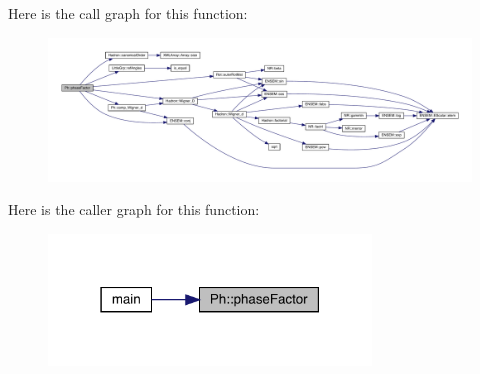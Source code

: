 Here is the call graph for this function\+:\nopagebreak
\begin{figure}[H]
\begin{center}
\leavevmode
\includegraphics[width=350pt]{d6/d3c/namespacePh_a438e6a04475dc71cc60cc5ad034e09b0_cgraph}
\end{center}
\end{figure}
Here is the caller graph for this function\+:
\nopagebreak
\begin{figure}[H]
\begin{center}
\leavevmode
\includegraphics[width=243pt]{d6/d3c/namespacePh_a438e6a04475dc71cc60cc5ad034e09b0_icgraph}
\end{center}
\end{figure}
